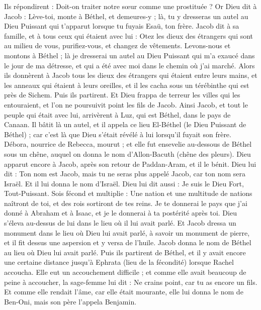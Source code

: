 \begin{multicols}{2}
Ils répondirent : Doit-on traiter notre sœur comme une prostituée ?
\VerseOne{}Or Dieu dit à Jacob : Lève-toi, monte à Béthel, et demeures-y ; là, tu y dresseras un autel au Dieu Puissant qui t'apparut lorsque tu fuyais Esaü, ton frère.
Jacob dit à sa famille, et à tous ceux qui étaient avec lui : Otez les dieux des étrangers qui sont au milieu de vous, purifiez-vous, et changez de vêtements.
Levons-nous et montons à Béthel ; là je dresserai un autel au Dieu Puissant qui m'a exaucé dans le jour de ma détresse, et qui a été avec moi dans le chemin où j'ai marché.
Alors ils donnèrent à Jacob tous les dieux des étrangers qui étaient entre leurs mains, et les anneaux qui étaient à leurs oreilles, et il les cacha sous un térébinthe qui est près de Sichem.
Puis ils partirent. Et Dieu frappa de terreur les villes qui les entouraient, et l’on ne poursuivit point les fils de Jacob.
Ainsi Jacob, et tout le peuple qui était avec lui, arrivèrent à Luz, qui est Béthel, dans le pays de Canaan.
Il bâtit là un autel, et il appela ce lieu El-Béthel (le Dieu Puissant de Béthel) ; car c’est là que Dieu s’était révélé à lui lorsqu’il fuyait son frère.
Débora,  nourrice de Rebecca, mourut ; et elle fut ensevelie au-dessous de Béthel sous un chêne, auquel on donna le nom d’Allon-Bacuth (chêne des pleurs).
Dieu apparut encore à Jacob, après son retour de Paddan-Aram, et il le bénit.
Dieu lui dit : Ton nom est Jacob, mais tu ne seras plus appelé Jacob, car ton nom sera Israël. Et il lui donna le nom d’Israël.
Dieu lui dit aussi : Je suis le Dieu Fort, Tout-Puissant. Sois fécond et multiplie : Une nation et une multitude de nations naîtront de toi, et des rois sortiront de tes reins.
Je te donnerai le pays que j'ai donné à Abraham et à Isaac, et je le donnerai à ta postérité après toi.
Dieu s’éleva au-dessus de lui dans le lieu où il lui avait parlé.
Et Jacob dressa un monument dans le lieu où Dieu lui avait parlé, à savoir un monument de pierre, et il fit dessus une aspersion et y versa de l'huile.
Jacob donna le nom de Béthel au lieu où Dieu lui avait parlé.
Puis ils partirent de Béthel, et il y avait encore une certaine distance jusqu’à Ephrata (lieu de la fécondité) lorsque Rachel accoucha. Elle eut un accouchement difficile ;
et comme elle avait beaucoup de peine à accoucher, la sage-femme lui dit : Ne crains point, car tu as encore un fils.
Et comme elle rendait l'âme, car elle était mourante, elle lui donna le nom de Ben-Oni, mais son père l’appela Benjamin.

\end{multicols}
